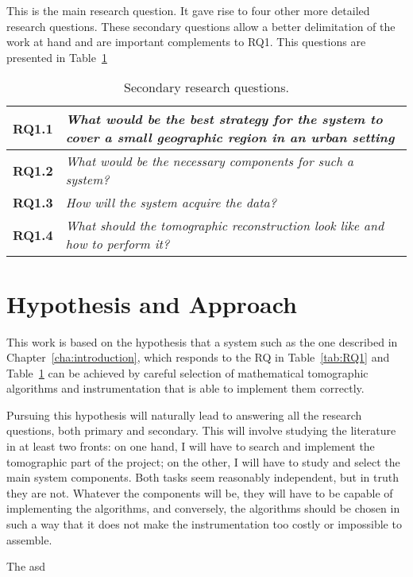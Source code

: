 This is the main research question. It gave rise to four other more
detailed research questions. These secondary questions allow a better
delimitation of the work at hand and are important complements to RQ1.
This questions are presented in Table~\ref{tab:sec_RQ}

\begin{table}[htpb]
    \centering
    \label{tab:sec_RQ}
    \caption{Secondary research questions.}
    \begin{tabularx}{0.8\textwidth}{cX}
        \toprule
        \textbf{RQ1.1}&\emph{ What would be the best strategy
        for the system to cover a small geographic region in an urban
        setting }\\
        \midrule
        \textbf{RQ1.2}&\emph{ What would be the necessary
        components for such a system? }\\
        \midrule
        \textbf{RQ1.3}&\emph{ How will the system acquire the
        data? }\\
        \midrule
        \textbf{RQ1.4}&\emph{ What should the tomographic
        reconstruction look like and how to perform it? }\\
        \bottomrule
    \end{tabularx}
\end{table}



\section{Hypothesis and Approach}%
\label{sec:hypothesis_and_approach}

This work is based on the hypothesis that a system such as the one
described in Chapter~\ref{cha:introduction}, which responds to the
\gls{RQ} in Table~\ref{tab:RQ1} and Table~\ref{tab:sec_RQ} can be
achieved by careful selection of mathematical tomographic algorithms and
instrumentation that is able to implement them correctly.

Pursuing this hypothesis will naturally lead to answering all the
research questions, both primary and secondary. This will involve
studying the literature in at least two fronts: on one hand, I will have
to search and implement the tomographic part of the project; on the
other, I will have to study and select the main system components. Both
tasks seem reasonably independent, but in truth they are not. Whatever
the components will be, they will have to be capable of implementing the
algorithms, and conversely, the algorithms should be chosen in such a
way that it does not make the instrumentation too costly or impossible
to assemble.

The asd


